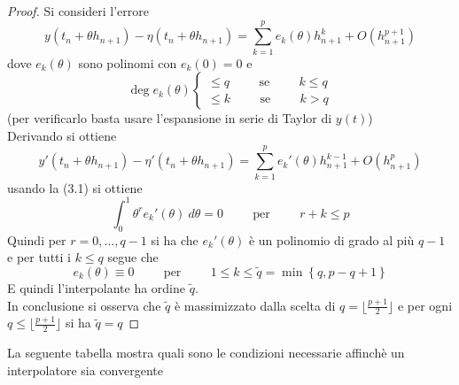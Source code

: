 \begin{proof}
Si consideri l'errore
$$
y(t_n + \theta h_{n+1}) - \eta(t_n + \theta h_{n+1}) =
\sum_{k=1}^p e_k(\theta) h_{n+1}^k + O(h_{n+1}^{p+1})
$$
dove $e_k(\theta)$ sono polinomi con $e_k(0)=0$ e
$$
\deg e_k(\theta) 
\begin{cases}
 \le q	\hspace{1cm}	\mbox{se}	\hspace{1cm}	k \le q		\\
 \le k	\hspace{1cm}	\mbox{se}	\hspace{1cm}	k > q
\end{cases}
$$
(per verificarlo basta usare l'espansione in serie di Taylor di $y(t)$)	\\
Derivando si ottiene
$$
y'(t_n + \theta h_{n+1}) - \eta'(t_n + \theta h_{n+1}) =
\sum_{k=1}^p e_k'(\theta) h_{n+1}^{k-1} + O(h_{n+1}^{p})
$$
usando la (3.1) si ottiene
$$
\int_0^1 \theta^r e_k'(\theta)	\ d \theta = 0
\hspace{1cm}
\mbox{per}
\hspace{1cm}
r+k \le p
$$
Quindi per $r=0, \dots, q-1$ si ha che $e_k'(\theta)$ è un polinomio di grado al più $q-1$ e per tutti i 
$k \le q$ segue che
$$
e_k(\theta) \equiv 0
\hspace{1cm}
\mbox{per}
\hspace{1cm}
1 \le k \le \tilde{q} = \min \left \{ q, p-q+1 \right \}
$$
E quindi l'interpolante ha ordine $\tilde{q}$.
\vspace{0.4cm}\\
In conclusione si osserva che $\tilde{q}$ è massimizzato dalla scelta di 
$q= \lfloor \frac{p+1}{2} \rfloor$ e per ogni $q \le  \lfloor \frac{p+1}{2} \rfloor$ si ha 
$\tilde{q}=q$
\end{proof}
\vspace{0.5cm}
La seguente tabella mostra quali sono le condizioni necessarie affinchè un interpolatore sia convergente

